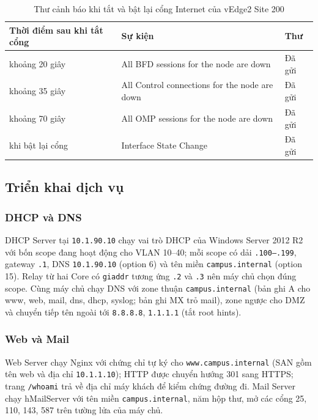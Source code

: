 \begin{table}[H]
    \centering
    \small
    \caption{Thư cảnh báo khi tắt và bật lại cổng Internet của vEdge2 Site 200}
    \label{tab:canh_bao_email}
    \begin{tabularx}{\textwidth}{|P{3.2cm}|X|P{2.4cm}|}
        \hline
        \textbf{Thời điểm sau khi tắt cổng} & \textbf{Sự kiện} & \textbf{Thư} \\
        \hline
        khoảng 20 giây & All BFD sessions for the node are down & Đã gửi \\
        \hline
        khoảng 35 giây & All Control connections for the node are down & Đã gửi \\
        \hline
        khoảng 70 giây & All OMP sessions for the node are down & Đã gửi \\
        \hline
        khi bật lại cổng & Interface State Change & Đã gửi \\
        \hline
    \end{tabularx}
\end{table}

\subsection{Triển khai dịch vụ}

\subsubsection{DHCP và DNS}

DHCP Server tại \texttt{10.1.90.10} chạy vai trò DHCP của Windows Server 2012 R2 với bốn scope đang hoạt động cho VLAN 10--40; mỗi scope có dải \texttt{.100--.199}, gateway \texttt{.1}, DNS \texttt{10.1.90.10} (option 6) và tên miền \texttt{campus.internal} (option 15). Relay từ hai Core có \texttt{giaddr} tương ứng \texttt{.2} và \texttt{.3} nên máy chủ chọn đúng scope. Cùng máy chủ chạy DNS với zone thuận \texttt{campus.internal} (bản ghi A cho www, web, mail, dns, dhcp, syslog; bản ghi MX trỏ mail), zone ngược cho DMZ và chuyển tiếp tên ngoài tới \texttt{8.8.8.8}, \texttt{1.1.1.1} (tắt root hints).

\subsubsection{Web và Mail}

Web Server chạy Nginx với chứng chỉ tự ký cho \texttt{www.campus.internal} (SAN gồm tên web và địa chỉ \texttt{10.1.1.10}); HTTP được chuyển hướng 301 sang HTTPS; trang \texttt{/whoami} trả về địa chỉ máy khách để kiểm chứng đường đi. Mail Server chạy hMailServer với tên miền \texttt{campus.internal}, năm hộp thư, mở các cổng 25, 110, 143, 587 trên tường lửa của máy chủ.

